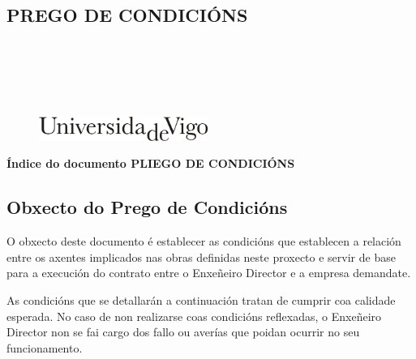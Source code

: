 \documentclass[11pt,twoside]{book}
\begin{document}
\begin{center}
\begin{normalsize}
\begin{center}
\part{\bf{PREGO DE CONDICIÓNS}}\thispagestyle{empty}
\end{center}
\end{normalsize}
\ \\
\ \\
\ \\
\ \\

\begin{center}
\begin{figure}[htbp]
\begin{center}
\includegraphics[angle=0, height=0.8cm]{images/UVIGOLogo.png}
\end{center}
\end{figure}
\end{center}

\end{center}

\cleardoublepage


\pagestyle{fancy}
\startcontents[parts]
\begin{center}{\large \bf Índice do documento PLIEGO DE CONDICIÓNS}\end{center}

{\hypersetup{hidelinks}}

\cleardoublepage

\chapter{Obxecto do Prego de Condicións}

O obxecto deste documento é establecer as condicións que establecen a relación entre os axentes implicados nas obras definidas neste proxecto e servir de base para a execución do contrato entre o Enxeñeiro Director e a empresa demandate.

As condicións que se detallarán a continuación tratan de cumprir coa calidade esperada. No caso de non realizarse coas condicións reflexadas, o Enxeñeiro Director non se fai cargo dos fallo ou averías que poidan ocurrir no seu funcionamento.
\end{document}
